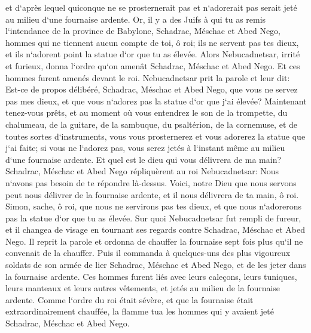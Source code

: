 \verse et d`après lequel quiconque ne se prosternerait pas et n`adorerait pas serait jeté au milieu d`une fournaise ardente. 
\verse Or, il y a des Juifs à qui tu as remis l`intendance de la province de Babylone, Schadrac, Méschac et Abed Nego, hommes qui ne tiennent aucun compte de toi, ô roi; ils ne servent pas tes dieux, et ils n`adorent point la statue d`or que tu as élevée. 
\verse Alors Nebucadnetsar, irrité et furieux, donna l`ordre qu`on amenât Schadrac, Méschac et Abed Nego. Et ces hommes furent amenés devant le roi. 
\verse Nebucadnetsar prit la parole et leur dit: Est-ce de propos délibéré, Schadrac, Méschac et Abed Nego, que vous ne servez pas mes dieux, et que vous n`adorez pas la statue d`or que j`ai élevée? 
\verse Maintenant tenez-vous prêts, et au moment où vous entendrez le son de la trompette, du chalumeau, de la guitare, de la sambuque, du psaltérion, de la cornemuse, et de toutes sortes d`instruments, vous vous prosternerez et vous adorerez la statue que j`ai faite; si vous ne l`adorez pas, vous serez jetés à l`instant même au milieu d`une fournaise ardente. Et quel est le dieu qui vous délivrera de ma main? 
\verse Schadrac, Méschac et Abed Nego répliquèrent au roi Nebucadnetsar: Nous n`avons pas besoin de te répondre là-dessus. 
\verse Voici, notre Dieu que nous servons peut nous délivrer de la fournaise ardente, et il nous délivrera de ta main, ô roi. 
\verse Simon, sache, ô roi, que nous ne servirons pas tes dieux, et que nous n`adorerons pas la statue d`or que tu as élevée. 
\verse Sur quoi Nebucadnetsar fut rempli de fureur, et il changea de visage en tournant ses regards contre Schadrac, Méschac et Abed Nego. Il reprit la parole et ordonna de chauffer la fournaise sept fois plus qu`il ne convenait de la chauffer. 
\verse Puis il commanda à quelques-uns des plus vigoureux soldats de son armée de lier Schadrac, Méschac et Abed Nego, et de les jeter dans la fournaise ardente. 
\verse Ces hommes furent liés avec leurs caleçons, leurs tuniques, leurs manteaux et leurs autres vêtements, et jetés au milieu de la fournaise ardente. 
\verse Comme l`ordre du roi était sévère, et que la fournaise était extraordinairement chauffée, la flamme tua les hommes qui y avaient jeté Schadrac, Méschac et Abed Nego. 
